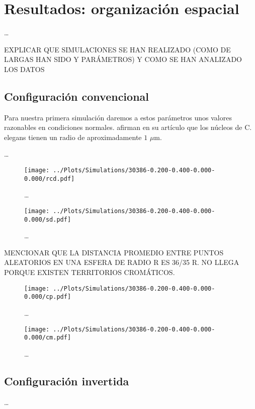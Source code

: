 \chapter{Resultados: organización espacial}
\label{cap:results}

\dots

EXPLICAR QUE SIMULACIONES SE HAN REALIZADO (COMO DE LARGAS HAN SIDO Y PARÁMETROS) Y COMO SE HAN ANALIZADO LOS DATOS

\section{Configuración convencional}

Para nuestra primera simulación daremos a estos parámetros unos valores razonables en condiciones normales. \cite{Ikegami2010} afirman en su artículo que los núcleos de C. elegans tienen un radio de aproximadamente $1$ $\mu$m.

\dots

\begin{figure}
    \centering
    \texttt{[image: ../Plots/Simulations/30386-0.200-0.400-0.000-0.000/rcd.pdf]}
    \caption{\dots}
    \label{fig:rcd_c}
\end{figure}

\begin{figure}
    \centering
    \texttt{[image: ../Plots/Simulations/30386-0.200-0.400-0.000-0.000/sd.pdf]}
    \caption{\dots}
    \label{fig:sd_c}
\end{figure}

MENCIONAR QUE LA DISTANCIA PROMEDIO ENTRE PUNTOS ALEATORIOS EN UNA ESFERA DE RADIO R ES 36/35 R. NO LLEGA PORQUE EXISTEN TERRITORIOS CROMÁTICOS.

\begin{figure}
    \centering
    \texttt{[image: ../Plots/Simulations/30386-0.200-0.400-0.000-0.000/cp.pdf]}
    \caption{\dots}
    \label{fig:cp_c}
\end{figure}

\begin{figure}
    \centering
    \texttt{[image: ../Plots/Simulations/30386-0.200-0.400-0.000-0.000/cm.pdf]}
    \caption{\dots}
    \label{fig:cm_c}
\end{figure}

\section{Configuración invertida}

\dots

